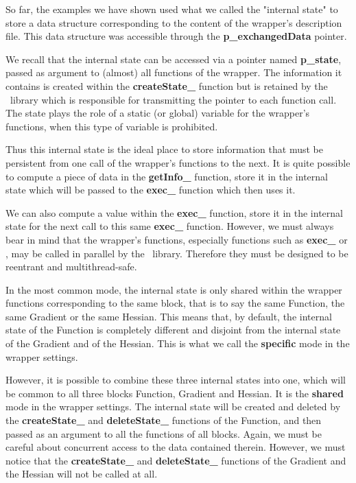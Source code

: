 So far, the examples we have shown used what we called the "internal state" to store a data structure corresponding to the content of the wrapper's description file. This data structure was accessible through the {\bf p\_exchangedData} pointer.

We recall that the internal state can be accessed via a pointer named {\bf p\_state}, passed as argument to (almost) all functions of the wrapper. The information it contains is created within the {\bf createState\_} function but is retained by the \OT\ library which is responsible for transmitting the pointer to each function call. The state plays the role of a static (or global) variable for the wrapper's functions, when this type of variable is prohibited.

Thus this internal state is the ideal place to store information that must be persistent from one call of the wrapper's functions to the next. It is quite possible to compute a piece of data in the {\bf getInfo\_} function, store it in the internal state which will be passed to the {\bf exec\_} function which then uses it.

We can also compute a value within the {\bf exec\_} function, store it in the internal state for the next call to this same {\bf exec\_} function. However, we must always bear in mind that the wrapper's functions, especially functions such as {\bf exec\_} or , may be called in parallel by the \OT\ library. Therefore they must be designed to be reentrant and multithread-safe.

In the most common mode, the internal state is only shared within the wrapper functions corresponding to the same block, that is to say the same Function, the same Gradient or the same Hessian. This means that, by default, the internal state of the Function is completely different and disjoint from the internal state of the Gradient and of the Hessian. This is what we call the {\bf specific} mode in the wrapper settings.

However, it is possible to combine these three internal states into one, which will be common to all three blocks Function, Gradient and Hessian. It is the {\bf shared} mode in the wrapper settings. The internal state will be created and deleted by the {\bf createState\_} and {\bf deleteState\_} functions of the Function, and then passed as an argument to all the functions of all blocks. Again, we must be careful about concurrent access to the data contained therein. However, we must notice that the {\bf createState\_} and {\bf deleteState\_} functions of the Gradient and the Hessian will not be called at all.

